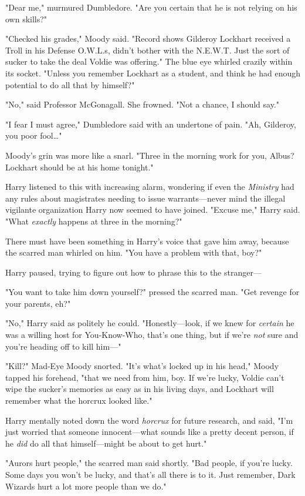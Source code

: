 "Dear me," murmured Dumbledore. "Are you certain that he is not relying on his
own skills?"

"Checked his grades," Moody said. "Record shows Gilderoy Lockhart received a
Troll in his Defense O.W.L.s, didn't bother with the N.E.W.T. Just the sort of
sucker to take the deal Voldie was offering." The blue eye whirled crazily
within its socket. "Unless you remember Lockhart as a student, and think he had
enough potential to do all that by himself?"

"No," said Professor McGonagall. She frowned. "Not a chance, I should say."

"I fear I must agree," Dumbledore said with an undertone of pain. "Ah,
Gilderoy, you poor fool{\ldots}"

Moody's grin was more like a snarl. "Three in the morning work for you, Albus?
Lockhart should be at his home tonight."

Harry listened to this with increasing alarm, wondering if even the
\emph{Ministry} had any rules about magistrates needing to issue
warrants---never mind the illegal vigilante organization Harry now seemed to
have joined. "Excuse me," Harry said. "What \emph{exactly} happens at three in
the morning?"

There must have been something in Harry's voice that gave him away, because the
scarred man whirled on him. "You have a problem with that, boy?"

Harry paused, trying to figure out how to phrase this to the stranger---

"You want to take him down yourself?" pressed the scarred man. "Get revenge for
your parents, eh?"

"No," Harry said as politely he could. "Honestly---look, if we knew for
\emph{certain} he was a willing host for You-Know-Who, that's one thing, but if
we're \emph{not} sure and you're heading off to kill him---"

"Kill?" Mad-Eye Moody snorted. "It's what's locked up in his head," Moody
tapped his forehead, "that we need from him, boy. If we're lucky, Voldie can't
wipe the sucker's memories as easy as in his living days, and Lockhart will
remember what the horcrux looked like."

Harry mentally noted down the word \emph{horcrux} for future research, and
said, "I'm just worried that someone innocent---what sounds like a pretty
decent person, if he \emph{did} do all that himself---might be about to get
hurt."

"Aurors hurt people," the scarred man said shortly. "Bad people, if you're
lucky. Some days you won't be lucky, and that's all there is to it. Just
remember, Dark Wizards hurt a lot more people than we do."

